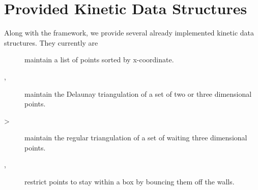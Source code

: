 \section{Provided Kinetic Data Structures}
\label{sec:provided_kdss}

Along with the framework, we provide several already implemented kinetic data structures. They currently are 
\begin{description}
\item[] maintain a list of points
sorted by x-coordinate.
\item[,] maintain the Delaunay triangulation of a set of two
or three dimensional points.
\item[>] maintain the regular triangulation of a set of waiting
three dimensional points.
\item[,
] restrict points to stay within
a box by bouncing them off the walls.
\end{description}







